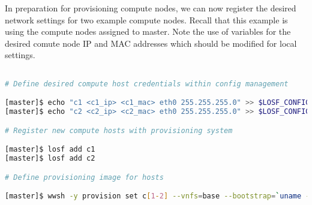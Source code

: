 \documentclass[letterpaper]{article}
\begin{document}



In preparation for provisioning compute nodes, we can now register the desired
network settings for two example compute nodes. Recall that this example is
using the compute nodes assigned to master. Note the use of variables for the
desired comute node IP and MAC addresses which should be modified for local
settings. 

\vspace*{0.2cm}

\begin{lstlisting}[language=bash,keywords={},upquote=true,basicstyle=\footnotesize\ttfamily]

# Define desired compute host credentials within config management

[master]$ echo "c1 <c1_ip> <c1_mac> eth0 255.255.255.0" >> $LOSF_CONFIG_DIR/ips.cluster
[master]$ echo "c2 <c2_ip> <c2_mac> eth0 255.255.255.0" >> $LOSF_CONFIG_DIR/ips.cluster

# Register new compute hosts with provisioning system

[master]$ losf add c1
[master]$ losf add c2

# Define provisioning image for hosts

[master]$ wwsh -y provision set c[1-2] --vnfs=base --bootstrap=`uname -r`

\end{lstlisting}
\end{document}
